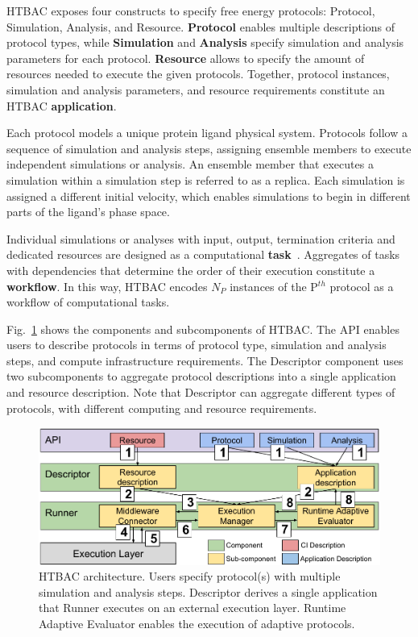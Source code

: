HTBAC exposes four constructs to specify free energy protocols: Protocol,
Simulation, Analysis, and Resource. \textbf{Protocol} enables multiple
descriptions of protocol types, while \textbf{Simulation} and
\textbf{Analysis} specify simulation and analysis parameters for each
protocol. \textbf{Resource} allows to specify the amount of resources needed
to execute the given protocols. Together, protocol instances, simulation and
analysis parameters, and resource requirements constitute an HTBAC
\textbf{application}.

Each protocol models a unique protein ligand physical system. Protocols
follow a sequence of simulation and analysis steps, assigning ensemble
members to execute independent simulations or analysis. An ensemble member
that executes a simulation within a simulation step is referred to as a
replica. Each simulation is assigned a different initial velocity, which
enables simulations to begin in different parts of the ligand's phase space.

Individual simulations or analyses with input, output, termination criteria
and dedicated resources are designed as a computational
\textbf{task}~\cite{power-of-many17}. Aggregates of tasks with dependencies
that determine the order of their execution constitute a \textbf{workflow}.
In this way, HTBAC encodes $N_P$ instances of the P$^{th}$ protocol as a
workflow of computational tasks.

Fig.~\ref{fig:architecture} shows the components and subcomponents of HTBAC.
The API enables users to describe protocols in terms of protocol type,
simulation and analysis steps, and compute infrastructure requirements. The
Descriptor component uses two subcomponents to aggregate protocol
descriptions into a single application and resource description. Note that
Descriptor can aggregate different types of protocols, with different
computing and resource requirements.

\begin{figure}
  \centering
  \includegraphics[width=\columnwidth]{figures/HTBAC_architecture_model.pdf}
  \caption{HTBAC architecture. Users specify protocol(s) with multiple
  simulation and analysis steps. Descriptor derives a single application that
  Runner executes on an external execution layer. Runtime Adaptive Evaluator
  enables the execution of adaptive protocols.}\label{fig:architecture}
\up{}
\up{}
\end{figure}

